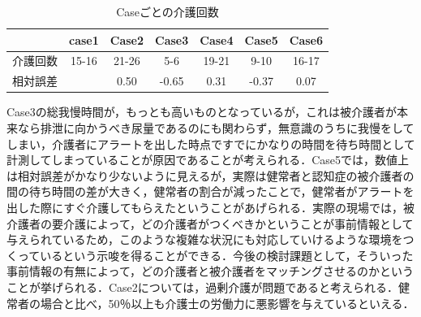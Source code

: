 \begin{table}[htb]
  \caption[Caseごとの介護回数]{Caseごとの介護回数}
  \label{number_of_care}
  \centering
  \begin{tabular}{r|c|c|c|c|c|c}
     & case1 & Case2 & Case3 & Case4 & Case5 & Case6 \\ \hline
    介護回数 & 15-16 & 21-26 & 5-6 & 19-21 & 9-10 & 16-17 \\
    相対誤差 & & 0.50 & -0.65 & 0.31 & -0.37 & 0.07 \\
    \end{tabular}
\end{table}

Case3の総我慢時間が，もっとも高いものとなっているが，これは被介護者が本来なら排泄に向かうべき尿量であるのにも関わらず，無意識のうちに我慢をしてしまい，介護者にアラートを出した時点ですでにかなりの時間を待ち時間として計測してしまっていることが原因であることが考えられる．Case5では，数値上は相対誤差がかなり少ないように見えるが，実際は健常者と認知症の被介護者の間の待ち時間の差が大きく，健常者の割合が減ったことで，健常者がアラートを出した際にすぐ介護してもらえたということがあげられる．実際の現場では，被介護者の要介護によって，どの介護者がつくべきかということが事前情報として与えられているため，このような複雑な状況にも対応していけるような環境をつくっているという示唆を得ることができる．今後の検討課題として，そういった事前情報の有無によって，どの介護者と被介護者をマッチングさせるのかということが挙げられる．Case2については，過剰介護が問題であると考えられる．健常者の場合と比べ，50％以上も介護士の労働力に悪影響を与えているといえる．
